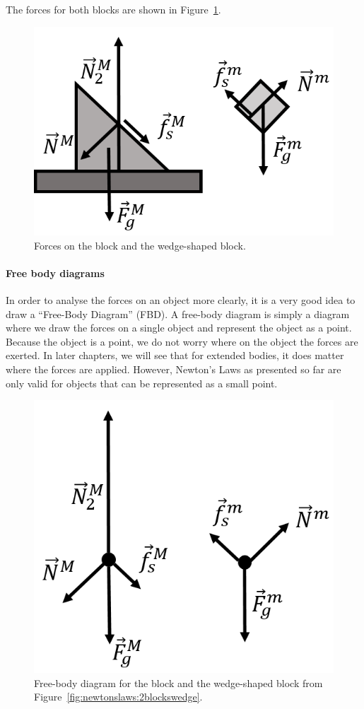 \begin{framed}
\begin{framed}
The forces for both blocks are shown in Figure~\ref{fig:newtonslaws:2blockswedge_forces}.

\begin{figure}[!htbp]
\centering
\includegraphics[width=0.4\linewidth]{files/2blockswedge_forces-5138bb9428de3882b524b92d121f8b64.png}
\caption[]{Forces on the block and the wedge-shaped block.}
\label{fig:newtonslaws:2blockswedge_forces}
\end{figure}
\end{framed}
\end{framed}

\paragraph{Free body diagrams}

In order to analyse the forces on an object more clearly, it is a very good idea to draw a ``Free-Body Diagram'' (FBD). A free-body diagram is simply a diagram where we draw the forces on a single object and represent the object as a point. Because the object is a point, we do not worry where on the object the forces are exerted. In later chapters, we will see that for extended bodies, it does matter where the forces are applied. However, Newton's Laws as presented so far are only valid for objects that can be represented as a small point.

\begin{figure}[!htbp]
\centering
\includegraphics[width=0.5\linewidth]{files/2blockswedge_fbd-3e88aaa142b1532dd88ad2089c06532d.png}
\caption[]{Free-body diagram for the block and the wedge-shaped block from Figure~\ref{fig:newtonslaws:2blockswedge}.}
\label{fig:newtonslaws:2blockswedge_fbd}
\end{figure}

